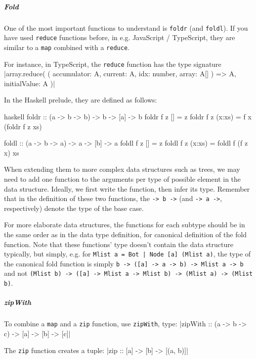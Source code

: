 \subparagraph{Fold}
One of the most important functions to understand is \texttt{foldr} (and \texttt{foldl}).
If you have used \texttt{reduce} functions before, in e.g. JavaScript / TypeScript,
they are similar to a \texttt{map} combined with a \texttt{reduce}.

For instance, in TypeScript, the \texttt{reduce} function has the type signature
|array.reduce( ( accumulator: A, current: A, idx: number, array: A[] ) => A, initialValue: A )|

In the Haskell prelude, they are defined as follows:
\begin{code}{haskell}
    foldr :: (a -> b -> b) -> b -> [a] -> b
    foldr f z []     = z
    foldr f z (x:xs) = f x (foldr f z xs)

    foldl :: (a -> b -> a) -> a -> [b] -> a
    foldl f z []     = z
    foldl f z (x:xs) = foldl f (f z x) xs
\end{code}
When extending them to more complex data structures such as trees, we may need to add one function to the arguments per type of possible element in the data structure.
Ideally, we first write the function, then infer its type.
Remember that in the definition of these two functions, the \texttt{-> b ->} (and \texttt{-> a ->}, respectively) denote the type of the base case.

For more elaborate data structures, the functions for each subtype should be in the same order as in the data type definition, for canonical definition of the fold function.
Note that these functions' type doesn't contain the data structure typically, but simply, e.g. for \texttt{Mlist a = Bot | Node [a] (Mlist a)},
the type of the canonical fold function is simply \texttt{b -> ([a] -> a -> b) -> Mlist a -> b} and not \texttt{(Mlist b) -> ([a] -> Mlist a -> Mlist b) -> (Mlist a) -> (Mlist b)}.


\subparagraph{zipWith}
To combine a \texttt{map} and a \texttt{zip} function, use \texttt{zipWith}, type:
|zipWith :: (a -> b -> c) -> [a] -> [b] -> [c]|

The \texttt{zip} function creates a tuple:
|zip :: [a] -> [b] -> [(a, b)]|



